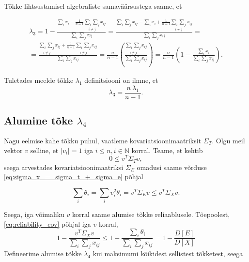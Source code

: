 \documentclass[a4paper,12pt]{article}
\numberwithin{equation}{section}
\theoremstyle{definition}
\begin{document}
Tõkke lihtsustamisel algebraliste samaväärsustega saame, et

\begin{equation*}
\begin{gathered}
\lambda_3 = 1 - \frac{\sum_i x_i - \frac{1}{n-1}{\underset{i \neq j}{\sum_i \sum_j} x_{ij}}}{\sum_i \sum_j x_{ij}} =  \frac{\sum_i \sum_j x_{ij} -  \sum_i x_i + \frac{1}{n-1}{\underset{i \neq j}{\sum_i \sum_j} x_{ij}}  }{\sum_i \sum_j x_{ij}} = \\
= \frac{{\underset{i \neq j}{\sum_i \sum_j} x_{ij}} + \frac{1}{n-1}{\underset{i \neq j}{\sum_i \sum_j} x_{ij}}}{\sum_i \sum_j x_{ij}} = \frac{n}{n-1} \left( \frac{\underset{i \neq j}{\sum_i \sum_j} x_{ij}}{\sum_i \sum_j x_{ij}} \right) = \frac{n}{n-1} \left(1 - \frac{\sum_i x_{i}}{\sum_i \sum_j x_{ij}} \right).
\end{gathered}
\end{equation*}

Tuletades meelde tõkke $\lambda_1$ definitsiooni on ilmne, et
\begin{equation}
\label{eq:lambda_3_from_lambda_1}
\lambda_3 = \frac{n\ \lambda_1}{n-1}.
\end{equation}
 

 
\subsection{Alumine tõke $\lambda_4$}

Nagu eelmise kahe tõkku puhul, vaatleme kovariatsioonimaatriksit $\Sigma_T$. Olgu meil vektor $v$ selline, et $\lvert {v_i} \rvert = 1$ iga $i \leq n, i \in \mathbb{N}$ korral.    
Teame, et kehtib
\begin{equation*}
0 \leq v^{T} \Sigma_T v,
\end{equation*}
seega arvestades kovariatsioonimaatriksi $\Sigma_E$ omadusi saame võrduse \eqref{eq:sigma_x_=_sigma_t_+_sigma_e} põhjal 

\begin{equation*}
\sum_i \theta_i = \sum_i v_{i}^{2} \theta_i = v^{T} \Sigma_E v \leq v^{T} \Sigma_X v.
\end{equation*}

Seega, iga võimaliku $v$ korral saame alumise tõkke reliaablusele. Tõepoolest, \eqref{eq:reliability_cov} põhjal iga $v$ korral,  
\begin{equation*}
1 - \frac{v^T \Sigma_X v}{\sum_i \sum_j x_{ij}} \leq 1 - \frac{\sum_i \theta_i}{\sum_i \sum_j x_{ij}} = 1 - \frac{D \left[ E \right]}{ D \left[X \right]  }
\end{equation*} 
Defineerime alumise tõkke $\lambda_4$ kui maksimumi kõikidest sellistest tõkketest, seega
\end{document}

